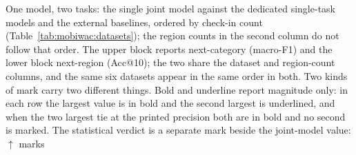 \begin{table}[htbp]
\caption{One model, two tasks: the single joint model against the dedicated single-task models and the
external baselines, ordered by check-in count (Table~\ref{tab:mobiwac:datasets}); the region counts in
the second column do not follow that order. The upper block reports next-category (macro-F1) and the
lower block next-region (Acc@10); the two share the dataset and region-count columns, and the same
six datasets appear in the same order in both. Two kinds of mark carry two different things. Bold
and underline report magnitude only: in each row the largest value is in bold and the second largest
is underlined, and when the two largest tie at the printed precision both are in bold and no second
is marked. The statistical verdict is a separate mark beside the joint-model value: $\uparrow$ marks
}
\end{table}
